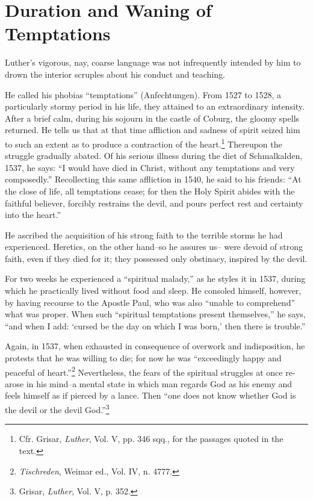 \section{Duration and Waning of Temptations}

Luther’s vigorous, nay, coarse language was not infrequently intended
by him to drown the interior scruples about his conduct and
teaching.

He called his phobias “temptations” (Anfechtungen). From 1527
to 1528, a particularly stormy period in his life, they attained to
an extraordinary intensity. After a brief calm, during his sojourn in
the castle of Coburg, the gloomy spells returned. He tells us that at
that time affliction and sadness of spirit seized him to such an extent
as to produce a contraction of the heart.\footnote
{Cfr. Grisar, \textit{Luther}, Vol. V, pp. 346 sqq., for the passages quoted in the text.}
Thereupon the struggle
gradually abated. Of his serious illness during the diet of Schmalkalden,
1537, he says: “I would have died in Christ, without any
temptations and very composedly.” Recollecting this same affliction
in 1540, he said to his friends: “At the close of life, all temptations
cease; for then the Holy Spirit abides with the faithful believer, forcibly
restrains the devil, and pours perfect rest and certainty into the
heart.”

He ascribed the acquisition of his strong faith to the terrible storms
he had experienced. Heretics, on the other hand--so he assures us--
were devoid of strong faith, even if they died for it; they possessed
only obstinacy, inspired by the devil.

For two weeks he experienced a “spiritual malady,” as he styles it in
1537, during which he practically lived without food and sleep. He
consoled himself, however, by having recourse to the Apostle Paul,
who was also “unable to comprehend” what was proper. When such
“spiritual temptations present themselves,” he says, “and when I
add: ‘cursed be the day on which I was born,’ then there is trouble.”

Again, in 1537, when exhausted in consequence of overwork and
indisposition, he protests that he was willing to die; for now he was
“exceedingly happy and peaceful of heart.”\footnote{\textit{Tischreden}, Weimar ed., Vol. IV, n. 4777.}
Nevertheless, the fears
of the spiritual struggles at once re-arose in his mind--a mental
state in which man regards God as his enemy and feels himself as if
pierced by a lance. Then “one does not know whether God is the
devil or the devil God.”\footnote{Grisar, \textit{Luther}, Vol. V, p. 352.}

